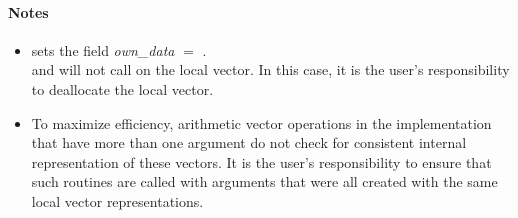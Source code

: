 \paragraph{\bf Notes} 
           
\begin{itemize}
                                        
\item
  {\warn} sets the field {\em own\_data} $=$ . \\
  and  will not call  on the local
  vector. In this case, it is the user's responsibility to deallocate the local vector.

\item
  {\warn}To maximize efficiency, arithmetic vector operations in the
  {\nvecmpiplusx} implementation that have more than one
   argument do not check for consistent internal
  representation of these vectors. It is the user's responsibility to
  ensure that such routines are called with  arguments
  that were all created with the same local vector representations.

\end{itemize}

